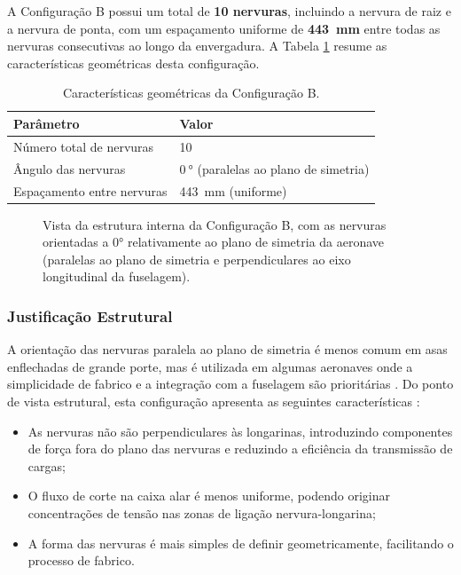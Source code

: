 \documentclass[a4paper,fleqn]{cas-sc}
\begin{document}
A Configuração B possui um total de \textbf{10 nervuras}, incluindo a nervura de raiz e a nervura de ponta, com um espaçamento uniforme de \textbf{\SI{443}{\milli\meter}} entre todas as nervuras consecutivas ao longo da envergadura. A Tabela \ref{tab:config_b} resume as características geométricas desta configuração.

\begin{table}
\centering
\caption{Características geométricas da Configuração B.}
\label{tab:config_b}
\renewcommand{\arraystretch}{1.4}
\begin{tabularx}{\textwidth}{p{6cm} X}
\toprule
\textbf{Parâmetro} & \textbf{Valor} \\
\midrule
Número total de nervuras            & 10 \\
Ângulo das nervuras                 & $\qty{0}{\degree}$ (paralelas ao plano de simetria) \\
Espaçamento entre nervuras          & \SI{443}{\milli\meter} (uniforme) \\
\bottomrule
\end{tabularx}
\end{table}

\begin{figure}
    \centering
    \caption{Vista da estrutura interna da Configuração B, com as nervuras orientadas a 0° relativamente ao plano de simetria da aeronave (paralelas ao plano de simetria e perpendiculares ao eixo longitudinal da fuselagem).}
    \label{fig:config_b}
\end{figure}

\subsubsection{Justificação Estrutural}

A orientação das nervuras paralela ao plano de simetria é menos comum em asas enflechadas de grande porte, mas é utilizada em algumas aeronaves onde a simplicidade de fabrico e a integração com a fuselagem são prioritárias \cite{Raymer2018}. Do ponto de vista estrutural, esta configuração apresenta as seguintes características \cite{Niu1988}:

\begin{itemize}
    \item As nervuras não são perpendiculares às longarinas, introduzindo componentes de força fora do plano das nervuras e reduzindo a eficiência da transmissão de cargas;
    \item O fluxo de corte na caixa alar é menos uniforme, podendo originar concentrações de tensão nas zonas de ligação nervura-longarina;
    \item A forma das nervuras é mais simples de definir geometricamente, facilitando o processo de fabrico.
\end{itemize}
\end{document}
